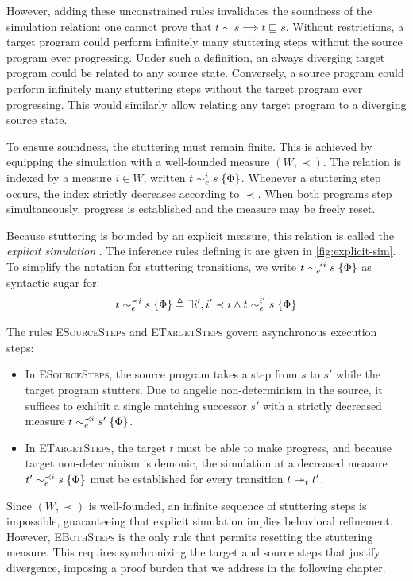 \documentclass[report.tex]{subfiles}
\begin{document}
However,
adding these unconstrained rules invalidates the soundness
of the simulation relation:
one cannot prove that $t \sim s \implies t \sqsubseteq s$.
Without restrictions,
a target program could perform infinitely many stuttering steps
without the source program ever progressing.
Under such a definition,
an always diverging target program could be related to any source state.
Conversely,
a source program could perform infinitely many stuttering steps
without the target program ever progressing.
This would similarly allow relating any target program
to a diverging source state.

To ensure soundness,
the stuttering must remain finite.
This is achieved by equipping the simulation
with a well-founded measure $(W, \prec)$.
The relation is indexed by a measure $i \in W$,
written $t \sim_{e}^{i} s \; \{\Phi\}$.
Whenever a stuttering step occurs,
the index strictly decreases according to $\prec$.
When both programs step simultaneously,
progress is established and the measure may be freely reset.

Because stuttering is bounded by an explicit measure,
this relation is called the \emph{explicit simulation}
\parencite{cho-23-stuttering}.
The inference rules defining it are given in
\cref{fig:explicit-sim}.
To simplify the notation for stuttering transitions,
we write $t \sim_{e}^{\prec i} s \; \{\Phi\}$ as syntactic sugar for:
\begin{equation*}
  t \sim_{e}^{\prec i} s \; \{\Phi\} \triangleq \exists i', i' \prec i \land t \sim_{e}^{i'} s \; \{\Phi\}
\end{equation*}

The rules \textsc{ESourceSteps} and \textsc{ETargetSteps}
govern asynchronous execution steps:
\begin{itemize}
  \item In \textsc{ESourceSteps},
        the source program takes a step from $s$ to $s'$
        while the target program stutters.
        Due to angelic non-determinism in the source,
        it suffices to exhibit a single matching successor $s'$
        with a strictly decreased measure $t \sim_{e}^{\prec i} s' \; \{\Phi\}$.

  \item In \textsc{ETargetSteps},
        the target $t$ must be able to make progress,
        and because target non-determinism is demonic,
        the simulation at a decreased measure $t' \sim_{e}^{\prec i} s \; \{\Phi\}$
        must be established for every transition $\step[t]{t}{t'}$.
\end{itemize}
Since $(W, \prec)$ is well-founded,
an infinite sequence of stuttering steps is impossible,
guaranteeing that explicit simulation implies behavioral refinement.
However,
\textsc{EBothSteps} is the only rule
that permits resetting the stuttering measure.
This requires synchronizing the target and source steps that
justify divergence,
imposing a proof burden that we address in the following chapter.
\end{document}
